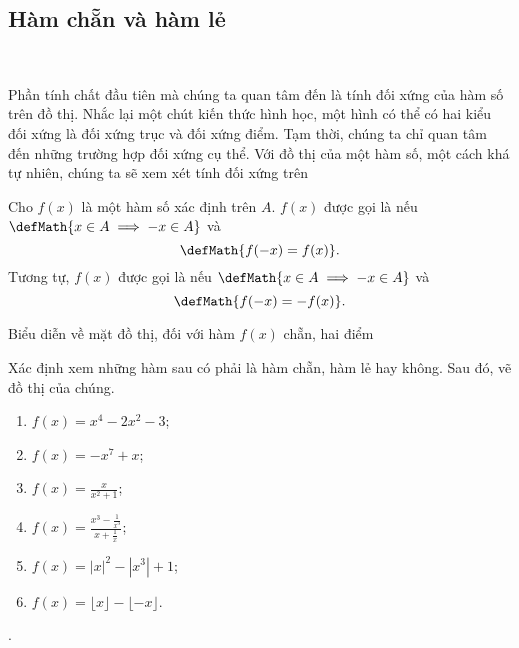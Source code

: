\subsection{Hàm chẵn và hàm lẻ}

\ %

Phần tính chất đầu tiên mà chúng ta quan tâm đến là tính đối xứng của hàm số trên đồ thị. Nhắc lại một chút kiến thức hình học, một hình có thể có hai kiểu đối xứng là đối xứng trục và đối xứng điểm. Tạm thời, chúng ta chỉ quan tâm đến những trường hợp đối xứng cụ thể. Với đồ thị của một hàm số, một cách khá tự nhiên, chúng ta sẽ xem xét tính đối xứng trên  

Cho $f(x)$ là một hàm số xác định trên $A$. $f(x)$ được gọi là  nếu $\defMath{x \in A \implies -x \in A}$ và $$\defMath{f(-x) = f(x)}.$$ Tương tự, $f(x)$ được gọi là  nếu $\defMath{x \in A \implies -x \in A}$ và $$\defMath{f(-x) = -f(x)}.$$

Biểu diễn về mặt đồ thị, đối với hàm $f(x)$ chẵn, hai điểm 

\exercise Xác định xem những hàm sau có phải là hàm chẵn, hàm lẻ hay không. Sau đó, vẽ đồ thị của chúng.
\begin{multicols}{2}
   \begin{enumerate}
      \item $f(x) = x^4 - 2x^2 - 3$;
      \item $f(x) = -x^7 + x$;
      \item $f(x) = \frac{x}{x^2 + 1}$;
      \item $f(x) = \frac{x^3 - \frac{1}{x^3}}{x + \frac{1}{x}}$;
      \item $f(x) = |x|^2 - \left|x^3\right| + 1$;
      \item $f(x) = \lfloor x \rfloor - \lfloor -x \rfloor$.
   \end{enumerate}
\end{multicols}

\solution 

\setcounter{subexercise}{1}
. 